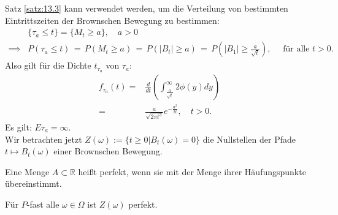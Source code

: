 \documentclass[a4paper,twoside,DIV15,BCOR12mm]{scrbook}
\begin{document}
\begin{bemerkung}
Satz \ref{satz:13.3} kann verwendet werden, um die Verteilung von bestimmten Eintrittszeiten der Brownschen Bewegung zu bestimmen: \\
\begin{align*}
&\{\tau_a\leq t\}=\{M_t\geq a\},\quad a>0  \\
\implies &P(\tau_a\leq t)\,=\,P(M_t\geq a)\,=\,P(\vert B_t\vert\geq a)\,=\,P(\vert B_1\vert\geq\frac{a}{\sqrt{t}}), \quad\text{ für alle }t>0.
\end{align*}
Also gilt für die Dichte $t_{\tau_a}$ von $\tau_a$:
\begin{align*}
  f_{\tau_a}(t)=&\frac{d}{dt}\left(\int_{\frac{a}{\sqrt{t}}}^\infty2\phi(y)dy\right) \\
=&\frac{a}{\sqrt{2\pi t^3}}e^{-\frac{a^2}{2t}},\quad t>0.
\end{align*}
Es gilt: $E\tau_a=\infty$.\\
Wir betrachten jetzt $Z(\omega):=\{t\geq0\vert B_t(\omega)=0\}$ die Nullstellen der Pfade $t\mapsto B_t(\omega)$ einer Brownschen Bewegung.
\end{bemerkung}
\begin{definition}
Eine Menge $A\subset\mathbb R$ heißt perfekt, wenn sie mit der Menge ihrer Häufungspunkte übereinstimmt.
\end{definition}
\begin{satz}
\label{satz:13.4}
    Für $P$-fast alle $\omega\in\Omega$ ist $Z(\omega)$ perfekt.
\end{satz}
\end{document}
